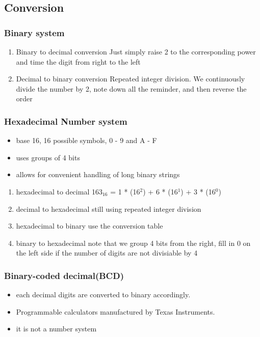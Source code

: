\documentclass[11pt]{article}
\begin{document}
\subsection{Conversion}
\label{sec:orga0ea7f1}
\subsubsection{Binary system}
\label{sec:orga747be8}
\begin{enumerate}
\item Binary to decimal conversion
\label{sec:org0814c6c}
Just simply raise 2 to the corresponding power and time the digit from right to the left
\item Decimal to binary conversion
\label{sec:org45df9e2}
Repeated integer division. We continuously divide the number by 2, note down all the reminder, and then reverse the order
\end{enumerate}
\subsubsection{Hexadecimal Number system}
\label{sec:org7edd546}
\begin{itemize}
\item base 16, 16 possible symbols, 0 - 9 and A - F
\item uses groups of 4 bits
\item allows for convenient handling of long binary strings
\end{itemize}
\begin{enumerate}
\item hexadecimal to decimal
\label{sec:org33e2bb4}
163\(_{\text{16}}\) = 1 * (16\(^{\text{2}}\)) + 6 * (16\(^{\text{1}}\)) + 3 * (16\(^{\text{0}}\))
\item decimal to hexadecimal
\label{sec:org90bf14c}
still using repeated integer division
\item hexadecimal to binary
\label{sec:orge1bc293}
use the conversion table
\item binary to hexadecimal
\label{sec:org18753b8}
note that we group 4 bits from the right, fill in 0 on the left side if the number of digits are not divisiable by 4
\end{enumerate}
\subsubsection{Binary-coded decimal(BCD)}
\label{sec:orgf1de88c}
\begin{itemize}
\item each decimal digits are converted to binary accordingly.
\item Programmable calculators manufactured by Texas Instruments.
\item it is not a number system
\end{itemize}
\end{document}

